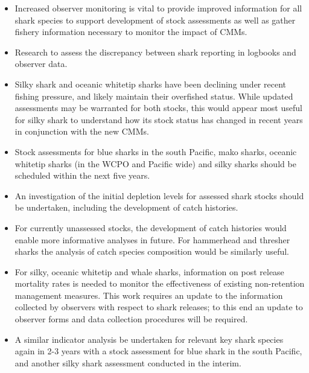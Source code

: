 \documentclass[12pt]{SCreport}
\begin{document}
 \begin{itemize}
\item Increased observer monitoring is vital to provide improved information for all shark species to support development of stock assessments as well as gather fishery information necessary to monitor the impact of CMMs.   
 
\item Research to assess the discrepancy between shark reporting in logbooks and observer data.  

\item Silky shark and oceanic whitetip sharks have been declining under recent fishing pressure, and likely maintain their overfished status. While updated assessments may be warranted for both stocks, this would appear most useful for silky shark to understand how its stock status has changed in recent years in conjunction with the new CMMs. 

\item Stock assessments for blue sharks in the south Pacific, mako sharks, oceanic whitetip sharks (in the WCPO and Pacific wide) and silky sharks should be scheduled within the next five years.   

\item An investigation of the initial depletion levels for assessed shark stocks should be undertaken, including the development of catch histories. 

\item For currently unassessed stocks, the development of catch histories would enable more informative analyses in future. For hammerhead and thresher sharks the analysis of catch species composition would be similarly useful.

\item  For silky, oceanic whitetip and whale sharks, information on post release mortality rates is needed to monitor the effectiveness of existing non-retention management measures. This work requires an update to the information collected by observers with respect to shark releases; to this end an update to observer forms and data collection procedures will be required. 

\item A similar indicator analysis be undertaken for relevant key shark species again in 2-3 years with a stock assessment for blue shark in the south Pacific, and another silky shark assessment conducted in the interim. 

\end{itemize}
\end{document}
